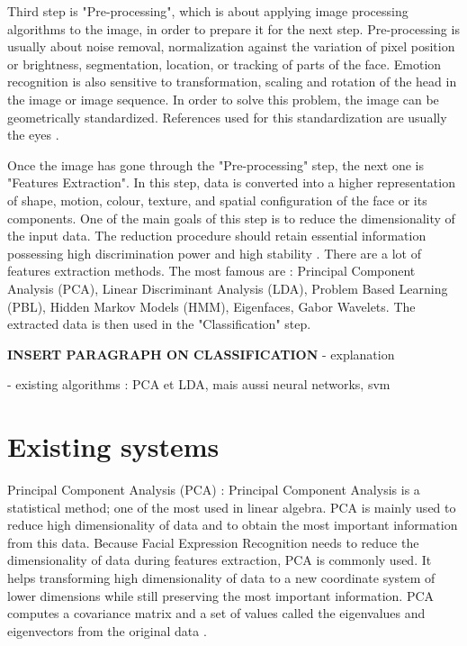 \noindent Third step is "Pre-processing", which is about applying image processing algorithms to the image, in order to prepare it for the next step. Pre-processing is usually about noise removal, normalization against the variation of pixel position or brightness, segmentation, location, or tracking of parts of the face. Emotion recognition is also sensitive to transformation, scaling and rotation of the head in the image or image sequence. In order to solve this problem, the image can be geometrically standardized. References used for this standardization are usually the eyes \cite{CHI03}.
\newline

\noindent Once the image has gone through the "Pre-processing" step, the next one is "Features Extraction". In this step, data is converted into a higher representation of shape, motion, colour, texture, and spatial configuration of the face or its components. One of the main goals of this step is to reduce the dimensionality of the input data. The reduction procedure should retain essential information possessing high discrimination power and high stability \cite{CHI03}. There are a lot of features extraction methods. The most famous are : Principal Component Analysis (PCA), Linear Discriminant Analysis (LDA), Problem Based Learning (PBL), Hidden Markov Models (HMM), Eigenfaces, Gabor Wavelets. The extracted data is then used in the "Classification" step.
\newline

\noindent
\textbf{\color{red} INSERT PARAGRAPH ON CLASSIFICATION}
- explanation

- existing algorithms : PCA et LDA, mais aussi neural networks, svm

\section{Existing systems}

\noindent Principal Component Analysis (PCA) : Principal Component Analysis is a statistical method; one of the most used in linear algebra. PCA is mainly used to reduce high dimensionality of data and to obtain the most important information from this data. Because Facial Expression Recognition needs to reduce the dimensionality of data during features extraction, PCA is commonly used. It helps transforming high dimensionality of data to a new coordinate system of lower dimensions while still preserving the most important information. PCA computes a covariance matrix and a set of values called the eigenvalues and eigenvectors from the original data \cite{GAN08}.
\newline

